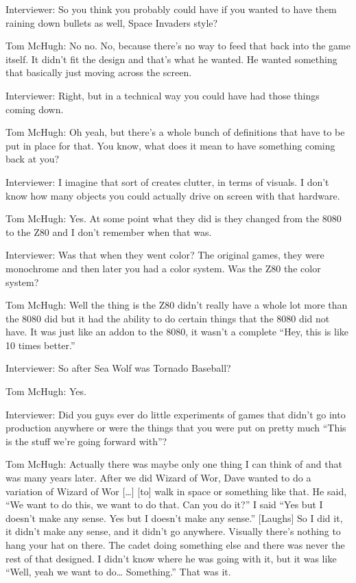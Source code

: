 \textcolor{interviewer}{Interviewer:} So you think you probably could have if you wanted to have them raining down bullets as well, Space Invaders style?

\textcolor{interviewee}{Tom McHugh:} No no. No, because there’s no way to feed that back into the game itself. It didn’t fit the design and that’s what he wanted. He wanted something that basically just moving across the screen.

\textcolor{interviewer}{Interviewer:} Right, but in a technical way you could have had those things coming down.

\textcolor{interviewee}{Tom McHugh:} Oh yeah, but there’s a whole bunch of definitions that have to be put in place for that. You know, what does it mean to have something coming back at you?

\textcolor{interviewer}{Interviewer:} I imagine that sort of creates clutter, in terms of visuals. I don’t know how many objects you could actually drive on screen with that hardware.

\textcolor{interviewee}{Tom McHugh:} Yes. At some point what they did is they changed from the 8080 to the Z80 and I don’t remember when that was.

\textcolor{interviewer}{Interviewer:} Was that when they went color? The original games, they were monochrome and then later you had a color system. Was the Z80 the color system?

\textcolor{interviewee}{Tom McHugh:} Well the thing is the Z80 didn’t really have a whole lot more than the 8080 did but it had the ability to do certain things that the 8080 did not have. It was just like an addon to the 8080, it wasn’t a complete “Hey, this is like 10 times better.”

\textcolor{interviewer}{Interviewer:} So after Sea Wolf was Tornado Baseball?

\textcolor{interviewee}{Tom McHugh:} Yes.

\textcolor{interviewer}{Interviewer:} Did you guys ever do little experiments of games that didn’t go into production anywhere or were the things that you were put on pretty much “This is the stuff we’re going forward with”?

\textcolor{interviewee}{Tom McHugh:} Actually there was maybe only one thing I can think of and that was many years later. After we did Wizard of Wor, Dave wanted to do a variation of Wizard of Wor […] [to] walk in space or something like that. He said, “We want to do this, we want to do that. Can you do it?” I said “Yes but I doesn’t make any sense. Yes but I doesn’t make any sense.” [Laughs] So I did it, it didn’t make any sense, and it didn’t go anywhere. Visually there’s nothing to hang your hat on there. The cadet doing something else and there was never the rest of that designed. I didn’t know where he was going with it, but it was like “Well, yeah we want to do… Something.” That was it.

